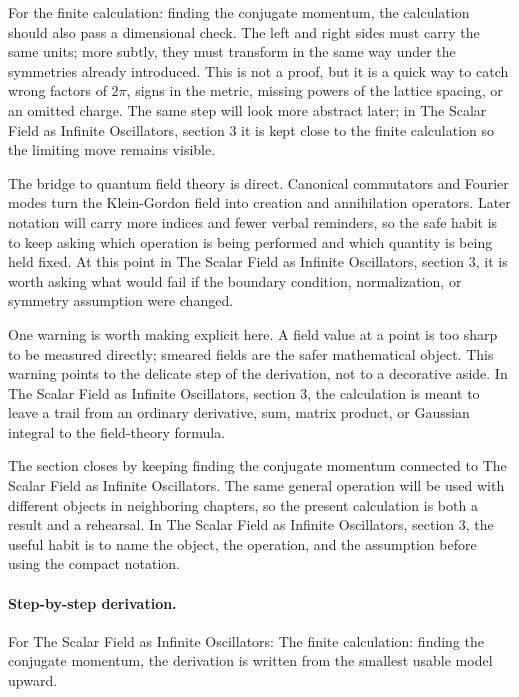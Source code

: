 For the finite calculation: finding the conjugate momentum, the calculation should also pass a dimensional check.  The left and right sides must carry the same units; more subtly, they must transform in the same way under the symmetries already introduced.  This is not a proof, but it is a quick way to catch wrong factors of \(2\pi\), signs in the metric, missing powers of the lattice spacing, or an omitted charge.  The same step will look more abstract later; in The Scalar Field as Infinite Oscillators, section 3 it is kept close to the finite calculation so the limiting move remains visible.

The bridge to quantum field theory is direct.  Canonical commutators and Fourier modes turn the Klein-Gordon field into creation and annihilation operators.  Later notation will carry more indices and fewer verbal reminders, so the safe habit is to keep asking which operation is being performed and which quantity is being held fixed.  At this point in The Scalar Field as Infinite Oscillators, section 3, it is worth asking what would fail if the boundary condition, normalization, or symmetry assumption were changed.

One warning is worth making explicit here.  A field value at a point is too sharp to be measured directly; smeared fields are the safer mathematical object.  This warning points to the delicate step of the derivation, not to a decorative aside.  In The Scalar Field as Infinite Oscillators, section 3, the calculation is meant to leave a trail from an ordinary derivative, sum, matrix product, or Gaussian integral to the field-theory formula.

The section closes by keeping finding the conjugate momentum connected to The Scalar Field as Infinite Oscillators.  The same general operation will be used with different objects in neighboring chapters, so the present calculation is both a result and a rehearsal.  In The Scalar Field as Infinite Oscillators, section 3, the useful habit is to name the object, the operation, and the assumption before using the compact notation.



\paragraph{Step-by-step derivation.}

For The Scalar Field as Infinite Oscillators: The finite calculation: finding the conjugate momentum, the derivation is written from the smallest usable model upward.

